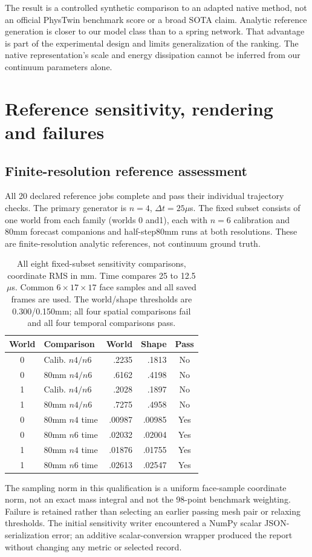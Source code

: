 \documentclass[10pt,twocolumn,letterpaper]{article}
\begin{document}
The result is a controlled synthetic comparison to an adapted native method, not an official PhysTwin benchmark score or a broad SOTA claim. Analytic reference generation is closer to our model class than to a spring network. That advantage is part of the experimental design and limits generalization of the ranking. The native representation's scale and energy dissipation cannot be inferred from our continuum parameters alone.

\section{Reference sensitivity, rendering and failures}
\subsection{Finite-resolution reference assessment}
All 20 declared reference jobs complete and pass their individual trajectory checks. The primary generator is $n=4$, $\Delta t=25\mu$s. The fixed subset consists of one world from each family (worlds 0 and1), each with $n=6$ calibration and 80mm forecast companions and half-step80mm runs at both resolutions. These are finite-resolution analytic references, not continuum ground truth.

\begin{table}[t]
\centering\small
\begin{tabular}{clrrc}
\toprule
World & Comparison & World & Shape & Pass\\
\midrule
0&Calib. $n4/n6$ &.2235&.1813&No\\
0&80mm $n4/n6$ &.6162&.4198&No\\
1&Calib. $n4/n6$ &.2028&.1897&No\\
1&80mm $n4/n6$ &.7275&.4958&No\\
0&80mm $n4$ time &.00987&.00985&Yes\\
0&80mm $n6$ time &.02032&.02004&Yes\\
1&80mm $n4$ time &.01876&.01755&Yes\\
1&80mm $n6$ time &.02613&.02547&Yes\\
\bottomrule
\end{tabular}
\caption{All eight fixed-subset sensitivity comparisons, coordinate RMS in mm. Time compares 25 to 12.5$\mu$s. Common $6\times17\times17$ face samples and all saved frames are used. The world/shape thresholds are 0.300/0.150mm; all four spatial comparisons fail and all four temporal comparisons pass.}
\end{table}
The sampling norm in this qualification is a uniform face-sample coordinate norm, not an exact mass integral and not the 98-point benchmark weighting. Failure is retained rather than selecting an earlier passing mesh pair or relaxing thresholds. The initial sensitivity writer encountered a NumPy scalar JSON-serialization error; an additive scalar-conversion wrapper produced the report without changing any metric or selected record.
\end{document}
